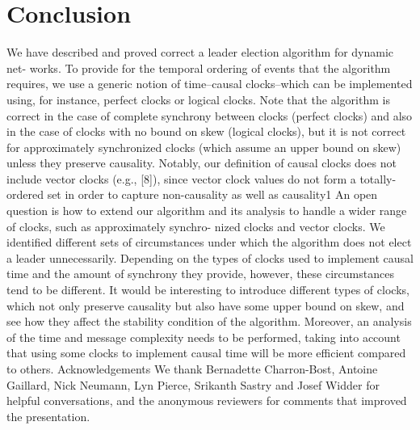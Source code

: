 \chapter{Conclusion}

We have described and proved correct a leader election algorithm for dynamic net- works. To provide for the temporal ordering of events that the algorithm requires, we use a generic notion of time–causal clocks–which can be implemented using, for instance, perfect clocks or logical clocks. Note that the algorithm is correct in the case of complete synchrony between clocks (perfect clocks) and also in the case of clocks with no bound on skew (logical clocks), but it is not correct for approximately synchronized clocks (which assume an upper bound on skew) unless they preserve causality. Notably, our definition of causal clocks does not include vector clocks (e.g., [8]), since vector clock values do not form a totally-ordered set in order to capture non-causality as well as causality1 An open question is how to extend our algorithm and its analysis to handle a wider range of clocks, such as approximately synchro- nized clocks and vector clocks. We identified different sets of circumstances under which the algorithm does not elect a leader unnecessarily. Depending on the types of clocks used to implement causal time and the amount of synchrony they provide, however, these circumstances tend to be different. It would be interesting to introduce different types of clocks, which not only preserve causality but also have some upper bound on skew, and see how they affect the stability condition of the algorithm. Moreover, an analysis of the time and message complexity needs to be performed, taking into account that using some clocks to implement causal time will be more efficient compared to others. Acknowledgements We thank Bernadette Charron-Bost, Antoine Gaillard, Nick Neumann, Lyn Pierce, Srikanth Sastry and Josef Widder for helpful conversations, and the anonymous reviewers for comments that improved the presentation.